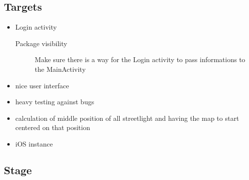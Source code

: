 \documentclass[a4paper,12pt]{book}
\begin{document}



\subsection{Targets}

\begin{itemize}
\item{Login activity}
   \begin{description}
   \item[]{}
   \item[Package visibility]{Make sure there is a way for the Login activity to pass informations to the MainActivity}
   \end{description}
\item{nice user interface}
\item{heavy testing against bugs}
\item{calculation of middle position of all streetlight and having the map to start centered on that position}
\item{iOS instance}
\end{itemize}

\clearpage

\subsection{Stage}
\end{document}
